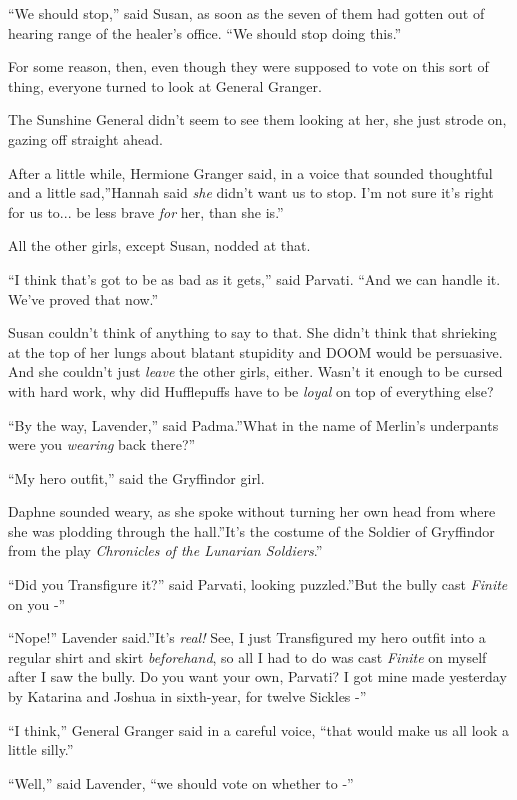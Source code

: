 ``We should stop,'' said Susan, as soon as the seven of them had gotten
out of hearing range of the healer's office. ``We should stop doing
this.''

For some reason, then, even though they were supposed to vote on this
sort of thing, everyone turned to look at General Granger.

The Sunshine General didn't seem to see them looking at her, she just
strode on, gazing off straight ahead.

After a little while, Hermione Granger said, in a voice that sounded
thoughtful and a little sad,''Hannah said \emph{she} didn't want us to
stop. I'm not sure it's right for us to... be less brave \emph{for}
her, than she is.''

All the other girls, except Susan, nodded at that.

``I think that's got to be as bad as it gets,'' said Parvati. ``And we
can handle it. We've proved that now.''

Susan couldn't think of anything to say to that. She didn't think that
shrieking at the top of her lungs about blatant stupidity and DOOM would
be persuasive. And she couldn't just \emph{leave} the other girls,
either. Wasn't it enough to be cursed with hard work, why did
Hufflepuffs have to be \emph{loyal} on top of everything else?

``By the way, Lavender,'' said Padma.''What in the name of Merlin's
underpants were you \emph{wearing} back there?''

``My hero outfit,'' said the Gryffindor girl.

Daphne sounded weary, as she spoke without turning her own head from
where she was plodding through the hall.''It's the costume of the
Soldier of Gryffindor from the play \emph{Chronicles of the Lunarian
Soldiers}.''

``Did you Transfigure it?'' said Parvati, looking puzzled.''But the
bully cast \emph{Finite} on you -''

``Nope!'' Lavender said.''It's \emph{real!} See, I just Transfigured my
hero outfit into a regular shirt and skirt \emph{beforehand}, so all I
had to do was cast \emph{Finite} on myself after I saw the bully. Do you
want your own, Parvati? I got mine made yesterday by Katarina and Joshua
in sixth-year, for twelve Sickles -''

``I think,'' General Granger said in a careful voice, ``that would make
us all look a little silly.''

``Well,'' said Lavender, ``we should vote on whether to -''


